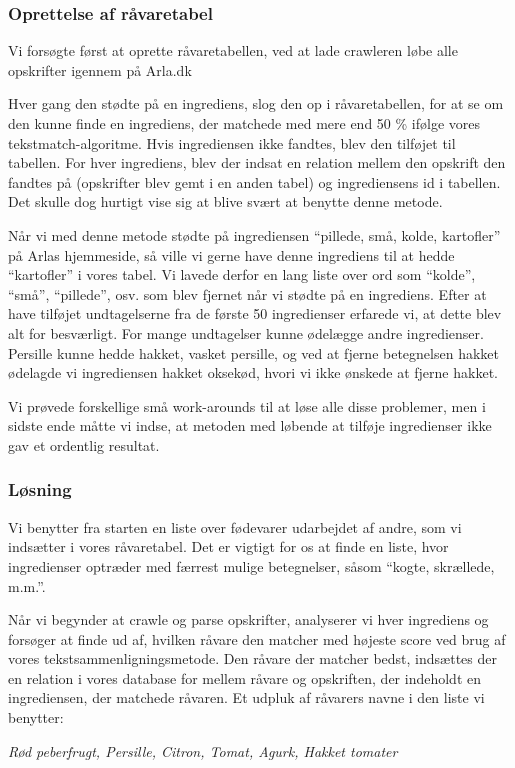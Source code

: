 \subsubsection{Oprettelse af råvaretabel}
Vi forsøgte først at oprette råvaretabellen, ved at lade crawleren løbe alle opskrifter igennem på Arla.dk

Hver gang den stødte på en ingrediens, slog den op i råvaretabellen, for at se om den kunne finde en ingrediens, der matchede med mere end 50 \% ifølge vores tekstmatch-algoritme. Hvis ingrediensen ikke fandtes, blev den tilføjet til tabellen. For hver ingrediens, blev der indsat en relation mellem den opskrift den fandtes på (opskrifter blev gemt i en anden tabel) og ingrediensens id i tabellen. Det skulle dog hurtigt vise sig at blive svært at benytte denne metode.

Når vi med denne metode stødte på ingrediensen ``pillede, små, kolde, kartofler'' på Arlas hjemmeside, så ville vi gerne have denne ingrediens til at hedde ``kartofler'' i vores tabel. Vi lavede derfor en lang liste over ord som \fx ``kolde'', ``små'', ``pillede'', osv. som blev fjernet når vi stødte på en ingrediens. Efter at have tilføjet undtagelserne fra de første 50 ingredienser erfarede vi, at dette blev alt for besværligt. For mange undtagelser kunne ødelægge andre ingredienser. Persille kunne hedde hakket, vasket persille, og ved at fjerne betegnelsen hakket ødelagde vi ingrediensen hakket oksekød, hvori vi ikke ønskede at fjerne hakket.

Vi prøvede forskellige små work-arounds til at løse alle disse problemer, men i sidste ende måtte vi indse, at metoden med løbende at tilføje ingredienser ikke gav et ordentlig resultat.

\subsubsection{Løsning}
Vi benytter fra starten en liste over fødevarer udarbejdet af andre, som vi indsætter i vores råvaretabel. Det er vigtigt for os at finde en liste, hvor ingredienser optræder med færrest mulige betegnelser, såsom ``kogte, skrællede, m.m.''.

Når vi begynder at crawle og parse opskrifter, analyserer vi hver ingrediens og forsøger at finde ud af, hvilken råvare den matcher med højeste score ved brug af vores tekstsammenligningsmetode. Den råvare der matcher bedst, indsættes der en relation i vores database for mellem råvare og opskriften, der indeholdt en ingrediensen, der matchede råvaren. Et udpluk af råvarers navne i den liste vi benytter:

\textit{Rød peberfrugt, Persille, Citron, Tomat, Agurk, Hakket tomater}